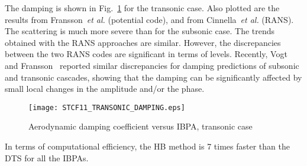 The damping is shown in Fig.~\ref{fig:stcf11_transonic_damping} for
the transonic case. Also plotted are the results from
Fransson~\emph{et al.} (potential code), and 
from Cinnella~\emph{et al.} (RANS). The scattering is much more severe
than for the subsonic case. The trends obtained with the RANS approaches are similar. However, the
discrepancies between the two RANS codes are significant in terms of
levels.
Recently, Vogt and Fransson~\cite{Vogt:2011fk} reported similar discrepancies 
for damping predictions of subsonic and transonic cascades, 
showing that the damping can be significantly affected by 
small local changes in the amplitude and/or the phase.
\begin{figure}[htb]
  \centering
  \texttt{[image: STCF11\_TRANSONIC\_DAMPING.eps]}
  \caption{Aerodynamic damping coefficient versus IBPA, transonic
    case}
  \label{fig:stcf11_transonic_damping}
\end{figure}
In terms of computational efficiency, the HB method is 7 times faster
than the DTS  for all the IBPAs.


